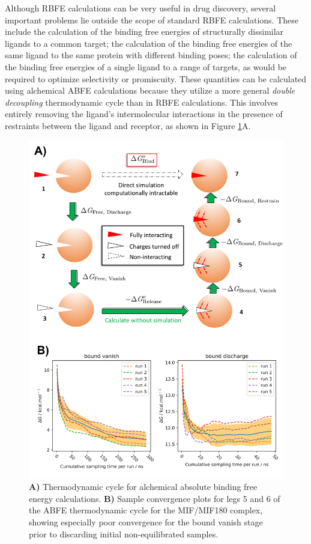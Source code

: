Although RBFE calculations can be very useful in drug discovery, several important problems lie outside the scope of standard RBFE calculations. These include the calculation of the binding free energies of structurally dissimilar ligands to a common target; the calculation of the binding free energies of the same ligand to the same protein with different binding poses; the calculation of the binding free energies of a single ligand to a range of targets, as would be required to optimize selectivity or promiscuity. These quantities can be calculated using alchemical ABFE calculations because they utilize a more general \emph{double decoupling} thermodynamic cycle than in RBFE calculations.\cite{gilson_statistical-thermodynamic_1997} This involves entirely removing the ligand's intermolecular interactions in the presence of restraints between the ligand and receptor, as shown in Figure \ref{abfe_fig}A. 

\begin{figure}[htp]
\includegraphics[width=\linewidth]{LIVECOMS/04_fep/abfe-tutorial.png}
\caption{ \textbf{A)} Thermodynamic cycle for alchemical absolute binding free energy calculations. \textbf{B)} Sample convergence plots for legs 5 and 6 of the ABFE thermodynamic cycle for the MIF/MIF180 complex, showing especially poor convergence for the bound vanish stage prior to discarding initial non-equilibrated samples.} 
\label{abfe_fig}
\end{figure}

